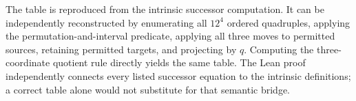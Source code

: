 \documentclass[11pt,letterpaper]{article}
\theoremstyle{definition}\newtheorem{definition}[theorem]{Definition}
\begin{document}
The table is reproduced from the intrinsic successor computation. It can be independently reconstructed by enumerating all $12^4$ ordered quadruples, applying the permutation-and-interval predicate, applying all three moves to permitted sources, retaining permitted targets, and projecting by $q$. Computing the three-coordinate quotient rule directly yields the same table. The Lean proof independently connects every listed successor equation to the intrinsic definitions; a correct table alone would not substitute for that semantic bridge.
\end{document}
